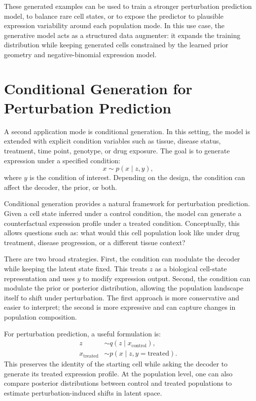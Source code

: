 \documentclass[11pt]{article}
\begin{document}
These generated examples can be used to train a stronger perturbation prediction model, to balance rare cell states, or to expose the predictor to plausible expression variability around each population mode. In this use case, the generative model acts as a structured data augmenter: it expands the training distribution while keeping generated cells constrained by the learned prior geometry and negative-binomial expression model.

\section{Conditional Generation for Perturbation Prediction}

A second application mode is conditional generation. In this setting, the model is extended with explicit condition variables such as tissue, disease status, treatment, time point, genotype, or drug exposure. The goal is to generate expression under a specified condition:
\begin{equation}
    x \sim p(x \mid z, y),
\end{equation}
where $y$ is the condition of interest. Depending on the design, the condition can affect the decoder, the prior, or both.

Conditional generation provides a natural framework for perturbation prediction. Given a cell state inferred under a control condition, the model can generate a counterfactual expression profile under a treated condition. Conceptually, this allows questions such as: what would this cell population look like under drug treatment, disease progression, or a different tissue context?

There are two broad strategies. First, the condition can modulate the decoder while keeping the latent state fixed. This treats $z$ as a biological cell-state representation and uses $y$ to modify expression output. Second, the condition can modulate the prior or posterior distribution, allowing the population landscape itself to shift under perturbation. The first approach is more conservative and easier to interpret; the second is more expressive and can capture changes in population composition.

For perturbation prediction, a useful formulation is:
\begin{align}
    z &\sim q(z \mid x_{\mathrm{control}}), \\
    x_{\mathrm{treated}} &\sim p(x \mid z, y=\mathrm{treated}).
\end{align}
This preserves the identity of the starting cell while asking the decoder to generate its treated expression profile. At the population level, one can also compare posterior distributions between control and treated populations to estimate perturbation-induced shifts in latent space.
\end{document}
